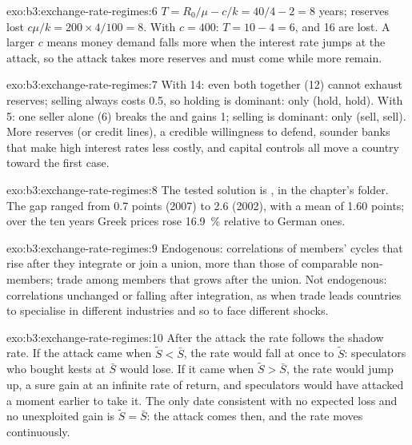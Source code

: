 \begin{solution}{exo:b3:exchange-rate-regimes:6}
$T = R_0/\mu - c/k = 40/4 - 2 = 8$ years; reserves lost $c\mu/k = 200 \times 4/100 = 8$. With $c = 400$:
$T = 10 - 4 = 6$, and 16 are lost. A larger $c$ means money demand falls more when the
interest rate jumps at the attack, so the attack takes more reserves and must come
while more remain.
\end{solution}

\begin{solution}{exo:b3:exchange-rate-regimes:7}
With 14: even both together (12) cannot exhaust reserves; selling always costs 0.5,
so holding is dominant: only (hold, hold). With 5: one seller alone (6) breaks the
 and gains 1; selling is dominant: only (sell, sell). More reserves (or credit
lines), a credible willingness to defend, sounder banks that make high interest
rates less costly, and capital controls all move a country toward the first case.
\end{solution}

\begin{solution}{exo:b3:exchange-rate-regimes:8}
The tested solution is , in the chapter's
 folder. The gap ranged from 0.7 points (2007) to 2.6 (2002), with a
mean of 1.60 points; over the ten years Greek prices rose 16.9~\% relative to German
ones. %
\end{solution}

\begin{solution}{exo:b3:exchange-rate-regimes:9}
Endogenous: correlations of members' cycles that rise after they integrate or join
a union, more than those of comparable non-members; trade among members that
grows after the union. Not endogenous: correlations unchanged or falling after
integration, as when trade leads countries to specialise in different industries
and so to face different shocks.
\end{solution}

\begin{solution}{exo:b3:exchange-rate-regimes:10}
After the attack the rate follows the shadow rate. If the attack came when $\tilde S <
\bar S$, the rate would fall at once to $\tilde S$: speculators who bought kests at $\bar S$ would lose.
If it came when $\tilde S > \bar S$, the rate would jump up, a sure gain at an infinite rate of
return, and speculators would have attacked a moment earlier to take it. The only
date consistent with no expected loss and no unexploited gain is $\tilde S = \bar S$: the
attack comes then, and the rate moves continuously.
\end{solution}

